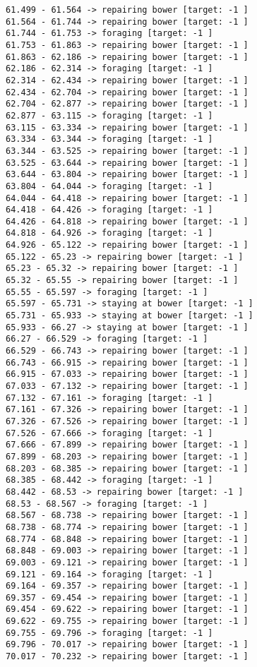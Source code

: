 \documentclass[11pt]{article}
\begin{document}
\begin{Verbatim}[commandchars=\\\{\}]
61.499 - 61.564 -> repairing bower [target: -1 ]
61.564 - 61.744 -> repairing bower [target: -1 ]
61.744 - 61.753 -> foraging [target: -1 ]
61.753 - 61.863 -> repairing bower [target: -1 ]
61.863 - 62.186 -> repairing bower [target: -1 ]
62.186 - 62.314 -> foraging [target: -1 ]
62.314 - 62.434 -> repairing bower [target: -1 ]
62.434 - 62.704 -> repairing bower [target: -1 ]
62.704 - 62.877 -> repairing bower [target: -1 ]
62.877 - 63.115 -> foraging [target: -1 ]
63.115 - 63.334 -> repairing bower [target: -1 ]
63.334 - 63.344 -> foraging [target: -1 ]
63.344 - 63.525 -> repairing bower [target: -1 ]
63.525 - 63.644 -> repairing bower [target: -1 ]
63.644 - 63.804 -> repairing bower [target: -1 ]
63.804 - 64.044 -> foraging [target: -1 ]
64.044 - 64.418 -> repairing bower [target: -1 ]
64.418 - 64.426 -> foraging [target: -1 ]
64.426 - 64.818 -> repairing bower [target: -1 ]
64.818 - 64.926 -> foraging [target: -1 ]
64.926 - 65.122 -> repairing bower [target: -1 ]
65.122 - 65.23 -> repairing bower [target: -1 ]
65.23 - 65.32 -> repairing bower [target: -1 ]
65.32 - 65.55 -> repairing bower [target: -1 ]
65.55 - 65.597 -> foraging [target: -1 ]
65.597 - 65.731 -> staying at bower [target: -1 ]
65.731 - 65.933 -> staying at bower [target: -1 ]
65.933 - 66.27 -> staying at bower [target: -1 ]
66.27 - 66.529 -> foraging [target: -1 ]
66.529 - 66.743 -> repairing bower [target: -1 ]
66.743 - 66.915 -> repairing bower [target: -1 ]
66.915 - 67.033 -> repairing bower [target: -1 ]
67.033 - 67.132 -> repairing bower [target: -1 ]
67.132 - 67.161 -> foraging [target: -1 ]
67.161 - 67.326 -> repairing bower [target: -1 ]
67.326 - 67.526 -> repairing bower [target: -1 ]
67.526 - 67.666 -> foraging [target: -1 ]
67.666 - 67.899 -> repairing bower [target: -1 ]
67.899 - 68.203 -> repairing bower [target: -1 ]
68.203 - 68.385 -> repairing bower [target: -1 ]
68.385 - 68.442 -> foraging [target: -1 ]
68.442 - 68.53 -> repairing bower [target: -1 ]
68.53 - 68.567 -> foraging [target: -1 ]
68.567 - 68.738 -> repairing bower [target: -1 ]
68.738 - 68.774 -> repairing bower [target: -1 ]
68.774 - 68.848 -> repairing bower [target: -1 ]
68.848 - 69.003 -> repairing bower [target: -1 ]
69.003 - 69.121 -> repairing bower [target: -1 ]
69.121 - 69.164 -> foraging [target: -1 ]
69.164 - 69.357 -> repairing bower [target: -1 ]
69.357 - 69.454 -> repairing bower [target: -1 ]
69.454 - 69.622 -> repairing bower [target: -1 ]
69.622 - 69.755 -> repairing bower [target: -1 ]
69.755 - 69.796 -> foraging [target: -1 ]
69.796 - 70.017 -> repairing bower [target: -1 ]
70.017 - 70.232 -> repairing bower [target: -1 ]

\end{Verbatim}
\end{document}
